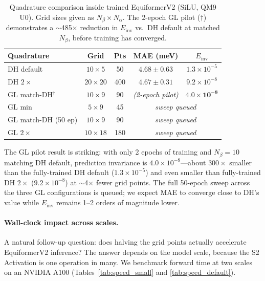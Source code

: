 \documentclass[10pt,twocolumn]{article}
\begin{document}
\begin{table}[t]
  \caption{Quadrature comparison inside trained EquiformerV2 (SiLU, QM9 U0).
  Grid sizes given as $N_\beta \!\times\! N_\alpha$. The 2-epoch GL pilot
  ($\dagger$) demonstrates a $\sim$485$\times$ reduction in $E_{\mathrm{inv}}$
  vs.\ DH default at matched $N_\beta$, before training has converged.}
  \label{tab:qm9_quad}
  \centering
  \small
  \begin{tabular}{lcccc}
    \toprule
    Quadrature & Grid & Pts & MAE (meV) & $E_{\mathrm{inv}}$ \\
    \midrule
    DH default              & $10{\times}5$  & 50  & $4.68 \pm 0.63$ & $1.3{\times}10^{-5}$ \\
    DH $2\times$            & $20{\times}20$ & 400 & $4.67 \pm 0.31$ & $9.2{\times}10^{-8}$ \\
    \midrule
    GL match-DH$^\dagger$   & $10{\times}9$  & 90  & {\itshape (2-epoch pilot)} & $\mathbf{4.0{\times}10^{-8}}$ \\
    GL min                  & $5{\times}9$   & 45  & \multicolumn{2}{c}{\itshape sweep queued} \\
    GL match-DH (50 ep)     & $10{\times}9$  & 90  & \multicolumn{2}{c}{\itshape sweep queued} \\
    GL $2\times$            & $10{\times}18$ & 180 & \multicolumn{2}{c}{\itshape sweep queued} \\
    \bottomrule
  \end{tabular}
\end{table}

The GL pilot result is striking: with only 2 epochs of training and $N_\beta{=}10$
matching DH default, prediction invariance is $4.0{\times}10^{-8}$---about $300\times$
smaller than the fully-trained DH default ($1.3{\times}10^{-5}$) and even smaller than
fully-trained DH $2\times$ ($9.2{\times}10^{-8}$) at $\sim$4$\times$ fewer grid points.
The full 50-epoch sweep across the three GL configurations is queued; we expect MAE
to converge close to DH's value while $E_{\mathrm{inv}}$ remains 1--2 orders of
magnitude lower.

\paragraph{Wall-clock impact across scales.}
A natural follow-up question: does halving the grid points actually accelerate
EquiformerV2 inference? The answer depends on the model scale, because the
S2 Activation is one operation in many. We benchmark forward time at two scales
on an NVIDIA A100 (Tables~\ref{tab:speed_small} and \ref{tab:speed_default}).
\end{document}
